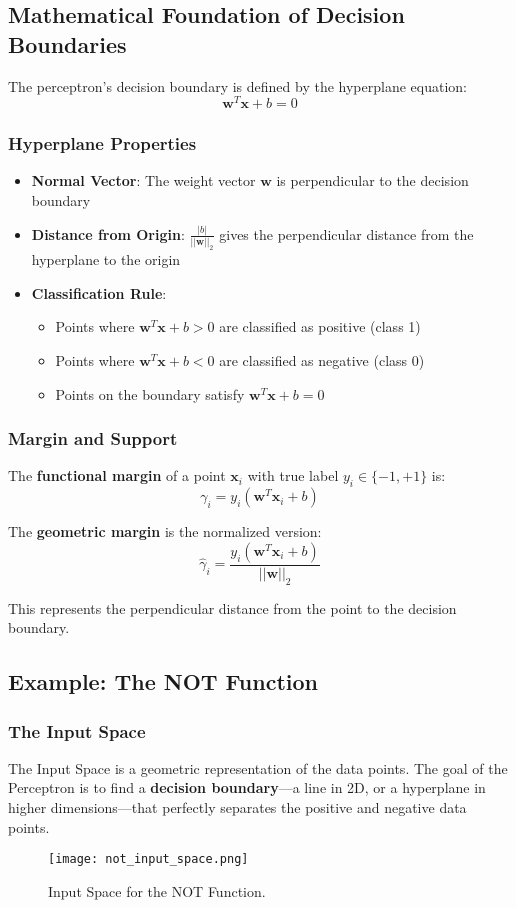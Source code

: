 \subsection{Mathematical Foundation of Decision Boundaries}
The perceptron's decision boundary is defined by the hyperplane equation:
\[\mathbf{w}^T \mathbf{x} + b = 0\]

\subsubsection{Hyperplane Properties}
\begin{itemize}
    \item \textbf{Normal Vector}: The weight vector \(\mathbf{w}\) is perpendicular to the decision boundary
    \item \textbf{Distance from Origin}: \(\frac{|b|}{||\mathbf{w}||_2}\) gives the perpendicular distance from the hyperplane to the origin
    \item \textbf{Classification Rule}:
    \begin{itemize}
        \item Points where \(\mathbf{w}^T \mathbf{x} + b > 0\) are classified as positive (class 1)
        \item Points where \(\mathbf{w}^T \mathbf{x} + b < 0\) are classified as negative (class 0)
        \item Points on the boundary satisfy \(\mathbf{w}^T \mathbf{x} + b = 0\)
    \end{itemize}
\end{itemize}

\subsubsection{Margin and Support}
The \textbf{functional margin} of a point \(\mathbf{x}_i\) with true label \(y_i \in \{-1, +1\}\) is:
\[\gamma_i = y_i(\mathbf{w}^T \mathbf{x}_i + b)\]

The \textbf{geometric margin} is the normalized version:
\[\hat{\gamma}_i = \frac{y_i(\mathbf{w}^T \mathbf{x}_i + b)}{||\mathbf{w}||_2}\]

This represents the perpendicular distance from the point to the decision boundary.

\subsection{Example: The NOT Function}
\subsubsection{The Input Space}
The Input Space is a geometric representation of the data points. The goal of the Perceptron is to find a \textbf{decision boundary}---a line in 2D, or a hyperplane in higher dimensions---that perfectly separates the positive and negative data points.
\begin{figure}[h!]
\centering
\texttt{[image: not\_input\_space.png]}
\caption{Input Space for the NOT Function.}
\end{figure}

